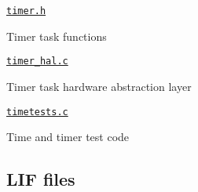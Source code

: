 \begin{DoxyItemize}
\begin{DoxyItemize}
\item \href{lib/timer.h}{\tt timer.\+h}
\begin{DoxyItemize}
\item Timer task functions
\end{DoxyItemize}
\item \href{lib/timer_hal.c}{\tt timer\+\_\+hal.\+c}
\begin{DoxyItemize}
\item Timer task hardware abstraction layer
\end{DoxyItemize}
\item \href{lib/timetests.c}{\tt timetests.\+c}
\begin{DoxyItemize}
\item Time and timer test code
\end{DoxyItemize}
\end{DoxyItemize}
\end{DoxyItemize}

\subsection*{L\+IF files}


